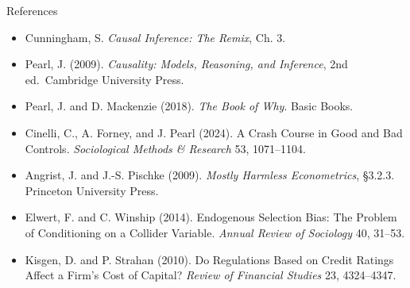 \documentclass[
  11pt,
  ignorenonframetext,
  aspectratio=169,
]{beamer}
\providecommand{\tightlist}{%
  \setlength{\itemsep}{0pt}\setlength{\parskip}{0pt}}
\begin{document}
\begin{frame}{References}
\protect{}\label{references}
\footnotesize

\begin{itemize}
\tightlist
\item
  Cunningham, S. \emph{Causal Inference: The Remix}, Ch. 3.
\item
  Pearl, J. (2009). \emph{Causality: Models, Reasoning, and Inference},
  2nd ed.~Cambridge University Press.
\item
  Pearl, J. and D. Mackenzie (2018). \emph{The Book of Why}. Basic
  Books.
\item
  Cinelli, C., A. Forney, and J. Pearl (2024). A Crash Course in Good
  and Bad Controls. \emph{Sociological Methods \& Research} 53,
  1071--1104.
\item
  Angrist, J. and J.-S. Pischke (2009). \emph{Mostly Harmless
  Econometrics}, §3.2.3. Princeton University Press.
\item
  Elwert, F. and C. Winship (2014). Endogenous Selection Bias: The
  Problem of Conditioning on a Collider Variable. \emph{Annual Review of
  Sociology} 40, 31--53.
\item
  Kisgen, D. and P. Strahan (2010). Do Regulations Based on Credit
  Ratings Affect a Firm's Cost of Capital? \emph{Review of Financial
  Studies} 23, 4324--4347.
\end{itemize}
\end{frame}
\end{document}
